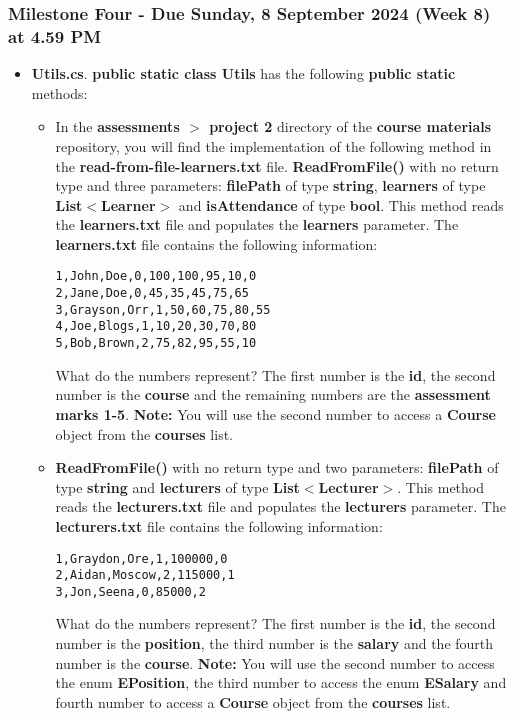 \documentclass{article}
\begin{document}
\subsubsection*{Milestone Four - Due Sunday, 8 September 2024 (Week 8) at 4.59 PM}

\begin{itemize}
    \item \textbf{Utils.cs}. \textbf{public static class Utils} has the following \textbf{public static} methods:
        \begin{itemize}
            \item In the \textbf{assessments $>$ project 2} directory of the \textbf{course materials} repository, you will find the implementation of the following method in the \textbf{read-from-file-learners.txt} file.
            \textbf{ReadFromFile()} with no return type and three parameters: \textbf{filePath} of type \textbf{string}, \textbf{learners} of type \textbf{List$<$Learner$>$} and \textbf{isAttendance} of type \textbf{bool}. This method reads the \textbf{learners.txt} file and populates the \textbf{learners} parameter. The \textbf{learners.txt} file contains the following information:\\
            \begin{verbatim}
1,John,Doe,0,100,100,95,10,0
2,Jane,Doe,0,45,35,45,75,65
3,Grayson,Orr,1,50,60,75,80,55
4,Joe,Blogs,1,10,20,30,70,80
5,Bob,Brown,2,75,82,95,55,10
            \end{verbatim}
            What do the numbers represent? The first number is the \textbf{id}, the second number is the \textbf{course} and the remaining numbers are the \textbf{assessment marks 1-5}. \textbf{Note:} You will use the second number to access a \textbf{Course} object from the \textbf{courses} list.
        \item \textbf{ReadFromFile()} with no return type and two parameters: \textbf{filePath} of type \textbf{string} and \textbf{lecturers} of type \textbf{List$<$Lecturer$>$}. This method reads the \textbf{lecturers.txt} file and populates the \textbf{lecturers} parameter. The \textbf{lecturers.txt} file contains the following information:\\
        \begin{verbatim}
1,Graydon,Ore,1,100000,0
2,Aidan,Moscow,2,115000,1
3,Jon,Seena,0,85000,2
        \end{verbatim}
        What do the numbers represent? The first number is the \textbf{id}, the second number is the \textbf{position}, the third number is the \textbf{salary} and the fourth number is the \textbf{course}. \textbf{Note:} You will use the second number to access the enum \textbf{EPosition}, the third number to access the enum \textbf{ESalary} and fourth number to access a \textbf{Course} object from the \textbf{courses} list.
    \end{itemize}
\end{itemize}
\end{document}
